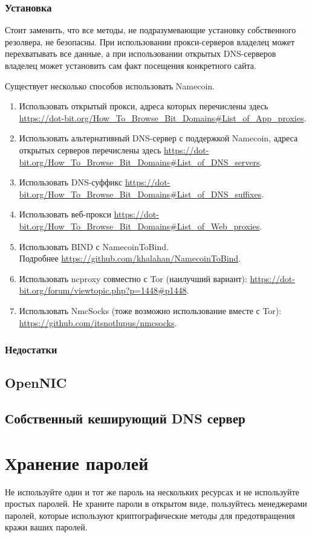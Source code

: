\subsubsection{Установка}
\begin{important}
Стоит заменить, что все методы, не подразумевающие установку собственного резолвера, не безопасны. При использовании прокси-серверов владелец может перехватывать все данные, а при использовании открытых DNS-серверов владелец может установить сам факт посещения конкретного сайта.
\end{important}
Существует несколько способов использовать Namecoin.
\begin{enumerate}
\item Использовать открытый прокси, адреса которых перечислены здесь \url{https://dot-bit.org/How_To_Browse_Bit_Domains#List_of_App_proxies}.
\item Использовать альтернативный DNS-сервер с поддержкой Namecoin, адреса открытых серверов перечислены здесь \url{https://dot-bit.org/How_To_Browse_Bit_Domains#List_of_DNS_servers}.
\item Использовать DNS-суффикс \url{https://dot-bit.org/How_To_Browse_Bit_Domains#List_of_DNS_suffixes}.
\item Использовать веб-прокси \url{https://dot-bit.org/How_To_Browse_Bit_Domains#List_of_Web_proxies}.
\item Использовать BIND с NamecoinToBind.\\Подробнее \url{https://github.com/khalahan/NamecoinToBind}.
\item Использовать ncproxy совместно с Tor (наилучший вариант): \url{https://dot-bit.org/forum/viewtopic.php?p=1448#p1448}.
\item Использовать NmcSocks (тоже возможно использование вместе с Tor): \url{https://github.com/itsnotlupus/nmcsocks}.
\end{enumerate}
\subsubsection{Недостатки}
\subsection{OpenNIC}
\subsection{Собственный кеширующий DNS сервер}

\section{Хранение паролей}
\begin{important}
Не используйте один и тот же пароль на нескольких ресурсах и не используйте простых паролей. Не храните пароли в открытом виде, пользуйтесь менеджерами паролей, которые используют криптографические методы для предотвращения кражи ваших паролей.
\end{important}
